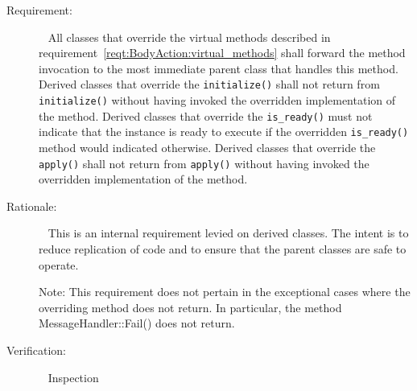 \label{reqt:BodyAction:overrides}
\begin{description}
\item[Requirement:]\ \newline
  All \ModelDesc classes that override the virtual methods
  described in requirement~\ref{reqt:BodyAction:virtual_methods}
  shall forward the method invocation to the
  most immediate parent class that handles this method.
  \label{reqt:BodyAction:initialize_override}
  Derived classes that override the {\tt initialize()} shall not
  return from {\tt initialize()} without having invoked the
  overridden implementation of the method.
  \label{reqt:BodyAction:is_ready_override}
  Derived classes that override the {\tt is\_ready()} must
  not indicate that the instance is ready to execute if the
  overridden {\tt is\_ready()} method would indicated otherwise.
  \label{reqt:BodyAction:apply_override}
  Derived classes that override the {\tt apply()} shall not
  return from {\tt apply()} without having invoked the
  overridden implementation of the method.
\item[Rationale:]\ \newline
  This is an internal requirement levied on derived classes.
  The intent is to reduce replication of code and to ensure
  that the parent classes are safe to operate.

  Note:
  This requirement does not pertain in the exceptional cases
  where the overriding method does not return.
  In particular, the method MessageHandler::Fail() does not return.
\item[Verification:]\ \newline
  Inspection
\end{description}
